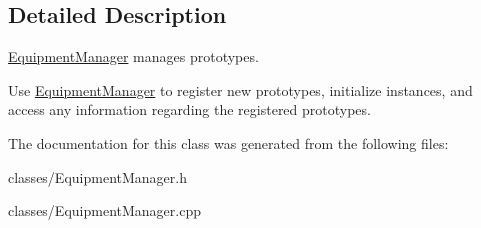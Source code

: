 \subsection{Detailed Description}
\hyperlink{class_equipment_manager}{Equipment\+Manager} manages prototypes.

Use \hyperlink{class_equipment_manager}{Equipment\+Manager} to register new prototypes, initialize instances, and access any information regarding the registered prototypes. 

The documentation for this class was generated from the following files\+:\begin{DoxyCompactItemize}
\item 
classes/Equipment\+Manager.\+h\item 
classes/Equipment\+Manager.\+cpp\end{DoxyCompactItemize}
